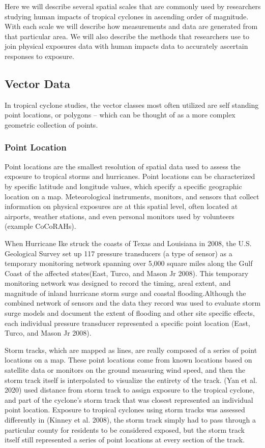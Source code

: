 \documentclass[
]{article}
\begin{document}
Here we will describe several spatial scales that are commonly used by
researchers studying human impacts of tropical cyclones in ascending
order of magnitude. With each scale we will describe how measurements
and data are generated from that particular area. We will also describe
the methods that researchers use to join physical exposures data with
human impacts data to accurately ascertain responses to exposure.

\hypertarget{vector-data}{%
\subsection{Vector Data}\label{vector-data}}

In tropical cyclone studies, the vector classes most often utilized are
self standing point locations, or polygons -- which can be thought of as
a more complex geometric collection of points.

\hypertarget{point-location}{%
\subsubsection{Point Location}\label{point-location}}

Point locations are the smallest resolution of spatial data used to
assess the exposure to tropical storms and hurricanes. Point locations
can be characterized by specific latitude and longitude values, which
specify a specific geographic location on a map. Meteorological
instruments, monitors, and sensors that collect information on physical
exposures are at this spatial level, often located at airports, weather
stations, and even personal monitors used by volunteers (example
CoCoRAHs).

When Hurricane Ike struck the coasts of Texas and Louisiana in 2008, the
U.S. Geological Survey set up 117 pressure transducers (a type of
sensor) as a temporary monitoring network spanning over 5,000 square
miles along the Gulf Coast of the affected states(East, Turco, and Mason
Jr 2008). This temporary monitoring network was designed to record the
timing, areal extent, and magnitude of inland hurricane storm surge and
coastal flooding.Although the combined network of sensors and the data
they record was used to evaluate storm surge models and document the
extent of flooding and other site specific effects, each individual
pressure transducer represented a specific point location (East, Turco,
and Mason Jr 2008).

Storm tracks, which are mapped as lines, are really composed of a series
of point locations on a map. These point locations come from known
locations based on satellite data or monitors on the ground measuring
wind speed, and then the storm track itself is interpolated to visualize
the entirety of the track. (Yan et al. 2020) used distance from storm
track to assign exposure to the tropical cyclone, and part of the
cyclone's storm track that was closest represented an individual point
location. Exposure to tropical cyclones using storm tracks was assessed
differently in (Kinney et al. 2008), the storm track simply had to pass
through a particular county for residents to be considered exposed, but
the storm track itself still represented a series of point locations at
every section of the track.
\end{document}
